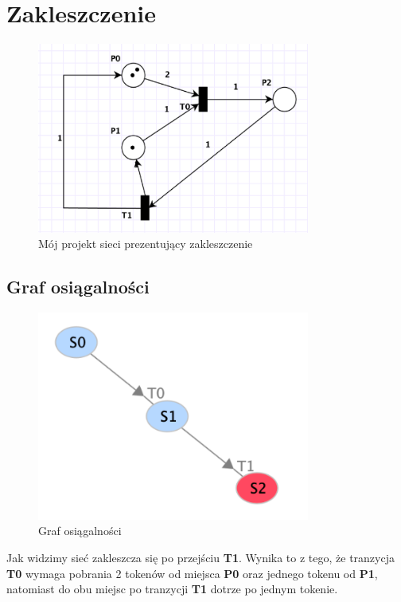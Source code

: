 \documentclass{article}
\begin{document}
\section{Zakleszczenie}
\begin{figure}[H]
    \centering
    \includegraphics[width=0.8\textwidth, height=0.4\textheight]{zad7.png}
    \caption{Mój projekt sieci prezentujący zakleszczenie}
\end{figure}

\subsection{Graf osiągalności}
\begin{figure}[H]
    \centering
    \includegraphics[width=0.8\textwidth, height=0.4\textheight]{zad7_graph.png}
    \caption{Graf osiągalności}
\end{figure}

Jak widzimy sieć zakleszcza się po przejściu \textbf{T1}.
Wynika to z tego, że tranzycja \textbf{T0} wymaga pobrania 2 tokenów od miejsca 
\textbf{P0} oraz jednego tokenu od \textbf{P1}, natomiast do obu miejsc po 
tranzycji \textbf{T1} dotrze po jednym tokenie.
\end{document}
